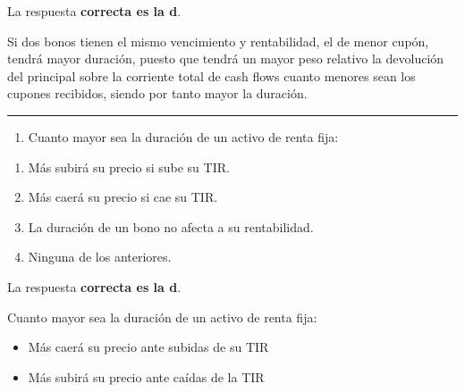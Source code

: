 \documentclass[
  letterpaper,
  DIV=11,
  numbers=noendperiod]{scrreprt}
\providecommand{\tightlist}{%
  \setlength{\itemsep}{0pt}\setlength{\parskip}{0pt}}\usepackage{longtable,booktabs,array}
\begin{document}
\begin{tcolorbox}[enhanced jigsaw, left=2mm, opacityback=0, colback=white, breakable, arc=.35mm, bottomrule=.15mm, rightrule=.15mm, toprule=.15mm, leftrule=.75mm, colframe=quarto-callout-tip-color-frame]
\begin{minipage}[t]{5.5mm}
\textcolor{quarto-callout-tip-color}{\faLightbulb}
\end{minipage}%
\begin{minipage}[t]{\textwidth - 5.5mm}

La respuesta \textbf{correcta es la d}.

Si dos bonos tienen el mismo vencimiento y rentabilidad, el de menor
cupón, tendrá mayor duración, puesto que tendrá un mayor peso relativo
la devolución del principal sobre la corriente total de cash flows
cuanto menores sean los cupones recibidos, siendo por tanto mayor la
duración.

\end{minipage}%
\end{tcolorbox}

\begin{center}\rule{0.5\linewidth}{0.5pt}\end{center}

\begin{enumerate}
\def\labelenumi{\arabic{enumi}.}
\setcounter{enumi}{86}
\tightlist
\item
  Cuanto mayor sea la duración de un activo de renta fija:
\end{enumerate}

\begin{enumerate}
\def\labelenumi{\alph{enumi})}
\item
  Más subirá su precio si sube su TIR.
\item
  Más caerá su precio si cae su TIR.
\item
  La duración de un bono no afecta a su rentabilidad.
\item
  Ninguna de los anteriores.
\end{enumerate}

\begin{tcolorbox}[enhanced jigsaw, left=2mm, opacityback=0, colback=white, breakable, arc=.35mm, bottomrule=.15mm, rightrule=.15mm, toprule=.15mm, leftrule=.75mm, colframe=quarto-callout-tip-color-frame]
\begin{minipage}[t]{5.5mm}
\textcolor{quarto-callout-tip-color}{\faLightbulb}
\end{minipage}%
\begin{minipage}[t]{\textwidth - 5.5mm}

La respuesta \textbf{correcta es la d}.

Cuanto mayor sea la duración de un activo de renta fija:

\begin{itemize}
\item
  Más caerá su precio ante subidas de su TIR
\item
  Más subirá su precio ante caídas de la TIR
\end{itemize}

\end{minipage}%
\end{tcolorbox}
\end{document}

